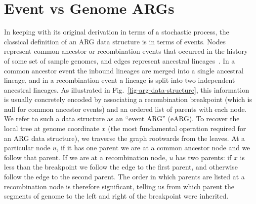 \documentclass{article}
\begin{document}
\section*{Event vs Genome ARGs}\label{eARG}
In keeping with its original derivation in terms of a stochastic
process, the classical definition of an ARG data structure is
in terms of events.
Nodes represent
common ancestor or recombination events that occurred in the
history of some set of sample genomes, and edges represent ancestral
lineages~\citep{griffiths1996ancestral}.
In a common ancestor event the inbound lineages are merged into a
single ancestral lineage, and in a recombination
event a lineage is split into two independent
ancestral lineages.
As illustrated in Fig.~\ref{fig-arg-data-structure}, this information
is usually concretely encoded by associating a recombination breakpoint
(which is null for common ancestor events) and an ordered list of parents
with each node. We refer to such a  data structure as an
``event ARG'' (eARG).
To recover the local tree at genome coordinate $x$ (the most
fundamental operation required for an ARG data structure),
we traverse the graph rootwards from the leaves.
At a particular
node $u$, if it has one parent we are at a common ancestor
node and we follow that parent. If we are at a
recombination node, $u$ has two parents: if
$x$ is less than the breakpoint we follow
the edge to the first parent, and otherwise follow the edge
to the second parent.
The order in which parents are listed at a recombination node is
therefore significant, telling us
from which parent the segments of genome to the left and right of the breakpoint
were inherited.

\end{document}
